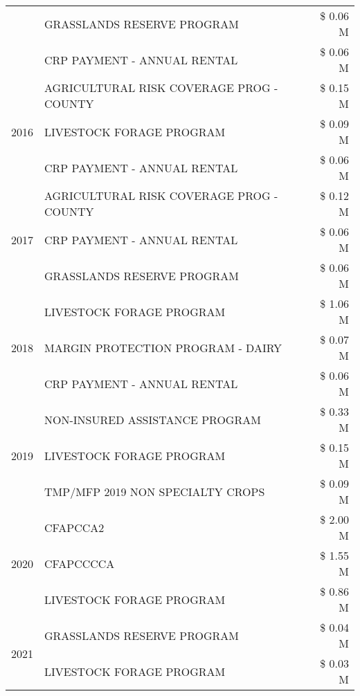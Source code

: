 \begin{tabular}{llr}
 & GRASSLANDS RESERVE PROGRAM & \$ 0.06 M \\
 & CRP PAYMENT - ANNUAL RENTAL & \$ 0.06 M \\
\cline{1-3}
\multirow[t]{3}{*}{2016} & AGRICULTURAL RISK COVERAGE PROG - COUNTY & \$ 0.15 M \\
 & LIVESTOCK FORAGE PROGRAM & \$ 0.09 M \\
 & CRP PAYMENT - ANNUAL RENTAL & \$ 0.06 M \\
\cline{1-3}
\multirow[t]{3}{*}{2017} & AGRICULTURAL RISK COVERAGE PROG - COUNTY & \$ 0.12 M \\
 & CRP PAYMENT - ANNUAL RENTAL & \$ 0.06 M \\
 & GRASSLANDS RESERVE PROGRAM & \$ 0.06 M \\
\cline{1-3}
\multirow[t]{3}{*}{2018} & LIVESTOCK FORAGE PROGRAM & \$ 1.06 M \\
 & MARGIN PROTECTION PROGRAM - DAIRY & \$ 0.07 M \\
 & CRP PAYMENT - ANNUAL RENTAL & \$ 0.06 M \\
\cline{1-3}
\multirow[t]{3}{*}{2019} & NON-INSURED ASSISTANCE PROGRAM & \$ 0.33 M \\
 & LIVESTOCK FORAGE PROGRAM & \$ 0.15 M \\
 & TMP/MFP 2019 NON SPECIALTY CROPS & \$ 0.09 M \\
\cline{1-3}
\multirow[t]{3}{*}{2020} & CFAPCCA2 & \$ 2.00 M \\
 & CFAPCCCCA & \$ 1.55 M \\
 & LIVESTOCK FORAGE PROGRAM & \$ 0.86 M \\
\cline{1-3}
\multirow[t]{2}{*}{2021} & GRASSLANDS RESERVE PROGRAM & \$ 0.04 M \\
 & LIVESTOCK FORAGE PROGRAM & \$ 0.03 M \\
\cline{1-3}
\bottomrule
\end{tabular}
